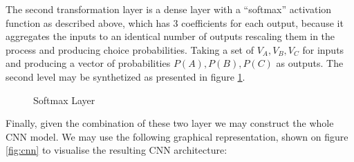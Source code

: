 \documentclass[12pt,]{article}
\begin{document}
The second transformation layer is a dense layer with a ``softmax''
activation function as described above, which has 3 coefficients for
each output, because it aggregates the inputs to an identical number of
outputs rescaling them in the process and producing choice
probabilities. Taking a set of \(V_A, V_B, V_C\) for inputs and
producing a vector of probabilities \(P(A), P(B), P(C)\) as outputs. The
second level may be synthetized as presented in figure \ref{fig:softl}.

\begin{figure}[!htbp] \centering 
 \caption{Softmax Layer} 
 \label{fig:softl} 
\end{figure}

Finally, given the combination of these two layer we may construct the
whole CNN model. We may use the following graphical representation,
shown on figure \ref{fig:cnn} to visualise the resulting CNN
architecture:

\FloatBarrier
\end{document}
